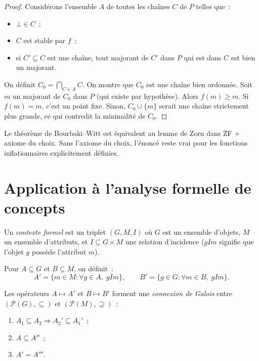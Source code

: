 \begin{proof}
Consid\'erons l'ensemble $A$ de toutes les cha\^ines $C$ de $P$ telles que~:
\begin{itemize}
  \item $\bot \in C$~;
  \item $C$ est stable par $f$~;
  \item si $C' \subseteq C$ est une cha\^ine, tout majorant de $C'$ dans $P$ qui est dans
    $C$ est bien un majorant.
\end{itemize}
On d\'efinit $C_0 = \bigcap_{C \in A} C$. On montre que $C_0$ est une cha\^ine bien
ordonn\'ee. Soit $m$ un majorant de $C_0$ dans $P$ (qui existe par hypoth\`ese). Alors
$f(m) \geq m$. Si $f(m) = m$, c'est un point fixe. Sinon, $C_0 \cup \{m\}$ serait une
cha\^ine strictement plus grande, ce qui contredit la minimalit\'e de $C_0$.
\end{proof}

\begin{remarque}
Le th\'eor\`eme de Bourbaki--Witt est \'equivalent au lemme de Zorn dans ZF + axiome du
choix. Sans l'axiome du choix, l'\'enonc\'e reste vrai pour les fonctions inflationnaires
explicitement d\'efinies.
\end{remarque}

\section{Application \`a l'analyse formelle de concepts}

\begin{definition}
Un \emph{contexte formel} est un triplet $(G, M, I)$ o\`u $G$ est un ensemble d'objets,
$M$ un ensemble d'attributs, et $I \subseteq G \times M$ une relation d'incidence ($gIm$
signifie que l'objet $g$ poss\`ede l'attribut $m$).
\end{definition}

\begin{definition}
Pour $A \subseteq G$ et $B \subseteq M$, on d\'efinit~:
\[
  A' = \{m \in M : \forall g \in A, \; gIm\}, \qquad
  B' = \{g \in G : \forall m \in B, \; gIm\}.
\]
\end{definition}

\begin{proposition}
Les op\'erateurs $A \mapsto A'$ et $B \mapsto B'$ forment une \emph{connexion de Galois}
entre $(\mathcal{P}(G), \subseteq)$ et $(\mathcal{P}(M), \supseteq)$~:
\begin{enumerate}
  \item $A_1 \subseteq A_2 \Rightarrow A_2' \subseteq A_1'$~;
  \item $A \subseteq A''$~;
  \item $A' = A'''$.
\end{enumerate}
\end{proposition}

